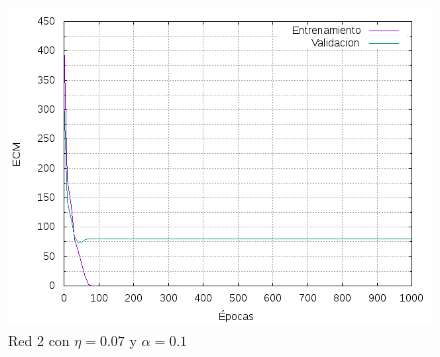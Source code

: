 
\begin{figure}[H]
  \includegraphics[width=125mm]{imagenes/ej1/ex_2-1_red_11-21-1_errors.png}
  \caption{Red 2 con $\eta = 0.07$ y $  \alpha = 0.1$}
\end{figure}

